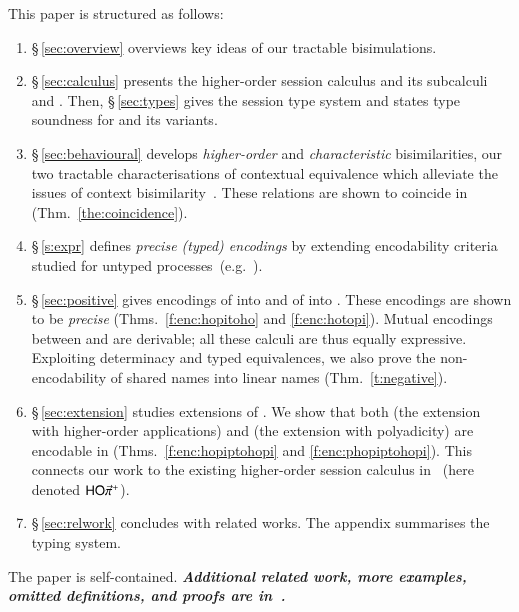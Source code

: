 This paper 
is structured as follows:
\begin{enumerate}[$\bullet$]
\item \S\,\ref{sec:overview} overviews key ideas of our tractable bisimulations.
\item \S\,\ref{sec:calculus} presents the higher-order session calculus \HOp and its 
subcalculi \HO and \sessp.  Then, \S\,\ref{sec:types} gives the session type system
and states type soundness for \HOp and its variants.
\item \S\,\ref{sec:behavioural} 
develops \emph{higher-order} and \emph{characteristic} bisimilarities, our two
tractable characterisations of contextual equivalence which 
alleviate the issues of context bisimilarity~\cite{San96H}. These 
relations are shown to coincide in \HOp (Thm.~\ref{the:coincidence}).
\item \S\,\ref{s:expr} defines \emph{precise (typed) encodings} by extending encodability criteria 
studied for
untyped processes~(e.g.~\cite{DBLP:journals/iandc/Gorla10,DBLP:conf/icalp/LanesePSS10}).
\item \S\,\ref{sec:positive} %
gives encodings of \HOp into \HO and of \HOp into \sessp.
These encodings 
are shown to be \emph{precise} (Thms.~\ref{f:enc:hopitoho} and \ref{f:enc:hotopi}).
Mutual encodings between \sessp and \HO are derivable; 
all these calculi are thus equally expressive.
Exploiting determinacy and typed equivalences,
we also prove the non-encodability of shared names
into linear names (Thm.~\ref{t:negative}).

\item \S\,\ref{sec:extension} studies extensions of \HOp. We show that 
both \HOpp (the extension with higher-order applications) 
and \pHOp (the extension with polyadicity) are encodable in \HOp
(Thms.~\ref{f:enc:hopiptohopi} and \ref{f:enc:phopiptohopi}).
This connects our work 
to the existing
higher-order session calculus in~\cite{tlca07} (here denoted  $\mathsf{HO}{\vec{\pi}}^{+}$).

\item \S\,\ref{sec:relwork} concludes with related works. The appendix summarises the typing system. 
\end{enumerate}
\noi
The paper is self-contained. 
{\bf\em Additional related work, more examples, omitted definitions, and  proofs 
are 
in~\cite{KouzapasPY15}.} 

